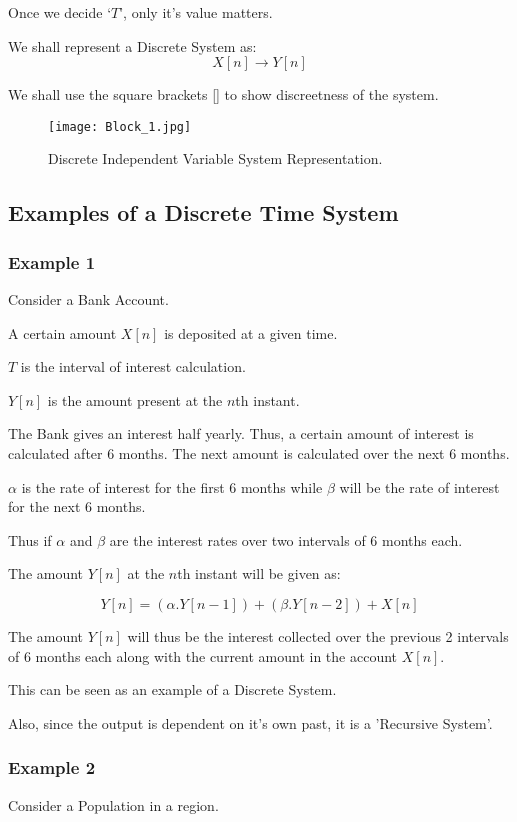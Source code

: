 Once we decide ‘$T$’, only it's value matters. 

We shall represent a Discrete System as: 
$$X[n] \rightarrow Y[n]$$

We shall use the square brackets [] to show discreetness of the system.


\begin{figure}[ht]
\centering
\texttt{[image: Block\_1.jpg]}
\caption{\label{fig:Block_1}Discrete Independent Variable System Representation.}
\end{figure}


\subsection{Examples of a Discrete Time System}

\subsubsection{Example 1}
Consider a Bank Account. 

A certain amount $X[n]$ is deposited at a given time.


$T$ is the interval of interest calculation.


$Y[n]$ is the amount present at the $n$th instant.


The Bank gives an interest half yearly. Thus, a certain amount of interest is calculated after 6 months. The next amount is calculated over the next 6 months.

$\alpha$ is the rate of interest for the first 6 months while $\beta$ will be the rate of interest for the next 6 months. 

Thus if $\alpha$ and $\beta$ are the interest rates over two intervals of 6 months each.

The amount $Y[n]$ at the $n$th instant will be given as:

$$Y[n]=(\alpha.Y[n-1])+(\beta.Y[n-2])+X[n]$$

The amount $Y[n]$ will thus be the interest collected over the previous 2 intervals of 6 months each along with the current amount in the account $X[n]$.

This can be seen as an example of a Discrete System. 

Also, since the output is dependent on it's own past, it is a 'Recursive System'.


\subsubsection{Example 2}
Consider a Population in a region. 

